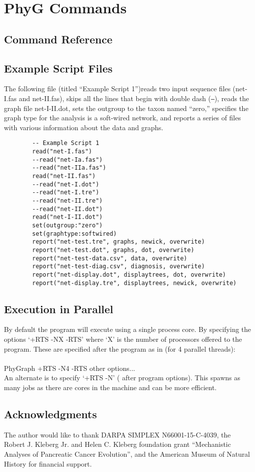\documentclass[11pt]{book}
\begin{document}
	\chapter{PhyG Commands}
	\section{Command Reference}
	
	
	\section{Example Script Files}
	The following file (titled ``Example Script 1'')reads two input sequence files (net-I.fas and net-II.fas), skips all the lines that begin with double dash (\texttt{--}),
	reads the graph file net-I-II.dot, sets the outgroup to the taxon named ``zero,'' specifies the graph type for the analysis is a soft-wired network, and
	reports a series of files with various information about the data and graphs.
	
	\begin{verbatim}
		-- Example Script 1
		read("net-I.fas")
		--read("net-Ia.fas")
		--read("net-IIa.fas")
		read("net-II.fas")
		--read("net-I.dot")
		--read("net-I.tre")
		--read("net-II.tre")
		--read("net-II.dot")
		read("net-I-II.dot")
		set(outgroup:"zero")
		set(graphtype:softwired)
		report("net-test.tre", graphs, newick, overwrite)
		report("net-test.dot", graphs, dot, overwrite)
		report("net-test-data.csv", data, overwrite)
		report("net-test-diag.csv", diagnosis, overwrite)
		report("net-display.dot", displaytrees, dot, overwrite)
		report("net-display.tre", displaytrees, newick, overwrite)
	\end{verbatim}
	
	\section{Execution in Parallel}
	By default the program will execute using a single process core.  By specifying the options `+RTS -NX -RTS' where `X' is the number of processors offered to the program. These are specified after the program as in (for 4 parallel threads):\\
	\\
	PhyGraph +RTS -N4 -RTS other options...  \\
	
	An alternate is to specify `+RTS -N' ( after program options).  This spawns as many jobs as there are cores in the machine and can be more efficient.
	
	\section*{Acknowledgments}
	The author would like to thank DARPA SIMPLEX N66001-15-C-4039, the  Robert J. Kleberg Jr. and Helen C. Kleberg foundation grant ``Mechanistic Analyses of Pancreatic Cancer Evolution'', and the American Museum of Natural History for financial support.  
	
	\newpage
	
\end{document}
